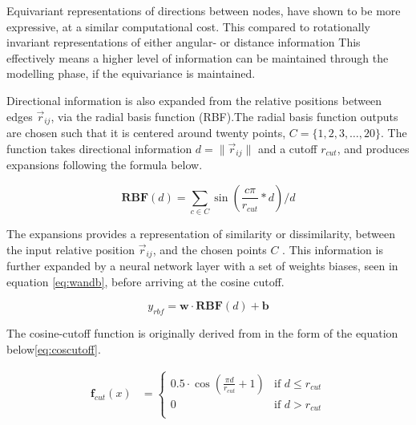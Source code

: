 


Equivariant representations of directions between nodes, have shown to be more expressive, at a similar computational cost.
This compared to rotationally invariant representations of either angular- or distance information
This effectively means a higher level of information can be maintained through the modelling phase, if the equivariance is
maintained.

Directional information is also expanded from the relative positions between edges $\vec{r}_{ij}$,
via the radial basis function (RBF)\cite{Atz2021}.The radial basis function outputs are chosen such that it is centered around twenty
points, $ C = \{1, 2, 3, \ldots, 20\}$. The function takes directional information $d = \lVert \vec{r}_{ij} \rVert$ and a cutoff
$r_{cut}$, and produces expansions following the formula below.

\begin{equation}\label{eq:rbf}
    \mathbf{RBF}(d) = \sum_{c \in C}\sin \left( \frac{c \pi}{r_{cut}} * d  \right) / d
\end{equation}

The expansions provides a representation of similarity or dissimilarity, between the input relative position $\vec{r}_{ij}$,
and the chosen points $C$ \cite{rbf}. This information is further expanded by a neural network layer with a set of weights
biases, seen in equation \ref{eq:wandb}, before arriving at the cosine cutoff.

\begin{equation}\label{eq:wandb}
    y_{rbf} = \mathbf{w} \cdot \mathbf{RBF}(d) + \mathbf{b}
\end{equation}

The cosine-cutoff function is originally derived from \cite{Behler2011}
in the form of the equation below\ref{eq:coscutoff}.

\begin{equation}\label{eq:coscutoff}
    \begin{aligned}
        \mathbf{f}_{cut}(x) & =
        \begin{cases}
            0.5 \cdot \cos \left( \frac{\pi d}{r_{cut}} + 1  \right) & \text{if } d \leq r_{cut} \\
            0                                                        & \text{if } d > r_{cut}    \\
        \end{cases}
    \end{aligned}
\end{equation}

